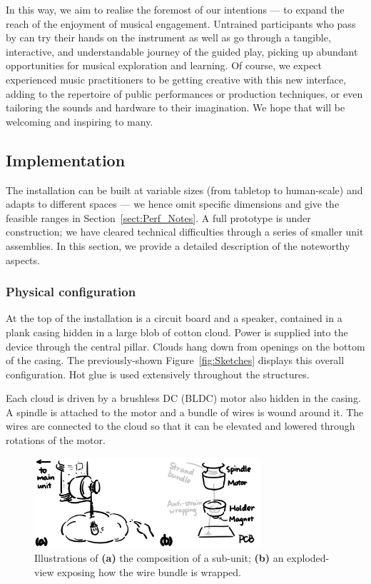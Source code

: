 \documentclass{nimemusic}
\begin{document}
In this way, we aim to realise the foremost of our intentions --- to expand the reach of the enjoyment of musical engagement. Untrained participants who pass by can try their hands on the instrument as well as go through a tangible, interactive, and understandable journey of the guided play, picking up abundant opportunities for musical exploration and learning. Of course, we expect experienced music practitioners to be getting creative with this new interface, adding to the repertoire of public performances or production techniques, or even tailoring the sounds and hardware to their imagination. We hope that \CuHum{} will be welcoming and inspiring to many.

\subsection{Implementation}
The installation can be built at variable sizes (from tabletop to human-scale) and adapts to different spaces --- we hence omit specific dimensions and give the feasible ranges in Section~\ref{sect:Perf_Notes}. A full prototype is under construction; we have cleared technical difficulties through a series of smaller unit assemblies. In this section, we provide a detailed description of the noteworthy aspects.

\subsubsection{Physical configuration}
At the top of the installation is a circuit board and a speaker, contained in a plank casing hidden in a large blob of cotton cloud. Power is supplied into the device through the central pillar. Clouds hang down from openings on the bottom of the casing. The previously-shown Figure~\ref{fig:Sketches} displays this overall configuration. Hot glue is used extensively throughout the structures.

Each cloud is driven by a brushless DC (BLDC) motor also hidden in the casing. A spindle is attached to the motor and a bundle of wires is wound around it. The wires are connected to the cloud so that it can be elevated and lowered through rotations of the motor.

\begin{figure}[h!]
  \includegraphics[width=0.75\textwidth]{Sub_Unit.png}
  \caption{Illustrations of \textbf{(a)} the composition of a sub-unit; \textbf{(b)} an exploded-view exposing how the wire bundle is wrapped.}
  \label{fig:Sub_Unit}
\end{figure}
\end{document}
